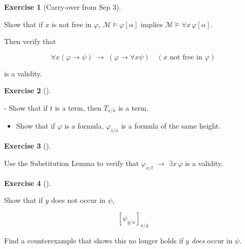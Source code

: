 \documentclass[
]{article}
\providecommand{\tightlist}{%
  \setlength{\itemsep}{0pt}\setlength{\parskip}{0pt}}
\theoremstyle{definition}
\newtheorem{exercise}{Exercise}[section]
\theoremstyle{remark}
\begin{document}
\begin{exercise}[Carry-over from Sep
3]\protect\hypertarget{exr-}{}\label{exr-}

\hfill\break
Show that if \(x\) is not free in \(\varphi\),
\(\mathcal{M} \models \varphi[\alpha]\) implies
\(\mathcal{M} \models \forall x \, \varphi [\alpha]\).

Then verify that

\[\forall x ( \varphi \to \psi) \; \to \; (\varphi \to \forall x \psi) \quad (\text{$x$ not free in $\varphi$})\]

is a validity.

\end{exercise}

\begin{exercise}[]\protect\hypertarget{exr-}{}\label{exr-}

\hfill\break
- Show that if \(t\) is a term, then \(T_{\bar{s}/\bar{x}}\) is a term.

\begin{itemize}
\tightlist
\item
  Show that if \(\varphi\) is a formula, \(\varphi_{\bar{s}/\bar{x}}\)
  is a formula of the same height.
\end{itemize}

\end{exercise}

\begin{exercise}[]\protect\hypertarget{exr-}{}\label{exr-}

\hfill\break
Use the Substitution Lemma to verify that
\(\varphi_{x/t} \; \to \; \exists x \, \varphi\) is a validity.

\end{exercise}

\begin{exercise}[]\protect\hypertarget{exr-}{}\label{exr-}

\hfill\break
Show that if \(y\) does not occur in \(\psi\),

\[
[\psi_{y/x}]_{x/y}
\]

Find a counterexample that shows this no longer holds if \(y\)
\emph{does} occur in \(\psi\).

\end{exercise}
\end{document}
